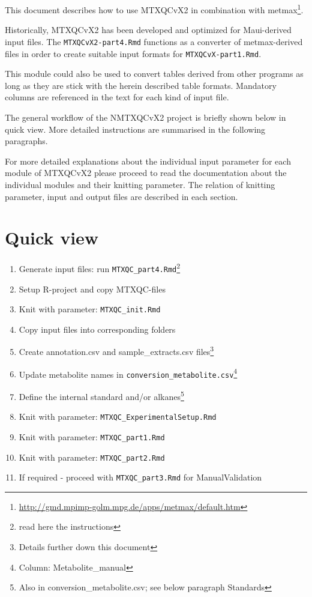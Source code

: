 \documentclass[]{book}
\providecommand{\tightlist}{%
  \setlength{\itemsep}{0pt}\setlength{\parskip}{0pt}}
\let\rmarkdownfootnote\footnote%
\def\footnote{\protect\rmarkdownfootnote}
\theoremstyle{definition}
\theoremstyle{definition}
\theoremstyle{definition}
\theoremstyle{remark}
\begin{document}
This document describes how to use MTXQCvX2 in combination with
metmax\footnote{\url{http://gmd.mpimp-golm.mpg.de/apps/metmax/default.htm}}.

Historically, MTXQCvX2 has been developed and optimized for Maui-derived
input files. The \texttt{MTXQCvX2-part4.Rmd} functions as a converter of
metmax-derived files in order to create suitable input formats for
\texttt{MTXQCvX-part1.Rmd}.

This module could also be used to convert tables derived from other
programs as long as they are stick with the herein described table
formats. Mandatory columns are referenced in the text for each kind of
input file.

The general workflow of the NMTXQCvX2 project is briefly shown below in
quick view. More detailed instructions are summarised in the following
paragraphs.

For more detailed explanations about the individual input parameter for
each module of MTXQCvX2 please proceed to read the documentation about
the individual modules and their knitting parameter. The relation of
knitting parameter, input and output files are described in each
section.

\section{Quick view}\label{quick-view-1}

\begin{enumerate}
\def\labelenumi{\arabic{enumi}.}
\tightlist
\item
  Generate input files: run \texttt{MTXQC\_part4.Rmd}\footnote{read here
    the instructions}
\item
  Setup R-project and copy MTXQC-files
\item
  Knit with parameter: \texttt{MTXQC\_init.Rmd}
\item
  Copy input files into corresponding folders
\item
  Create annotation.csv and sample\_extracts.csv files\footnote{Details
    further down this document}
\item
  Update metabolite names in
  \texttt{conversion\_metabolite.csv}\footnote{Column:
    Metabolite\_manual}
\item
  Define the internal standard and/or alkanes\footnote{Also in
    conversion\_metabolite.csv; see below paragraph Standards}
\item
  Knit with parameter: \texttt{MTXQC\_ExperimentalSetup.Rmd}
\item
  Knit with parameter: \texttt{MTXQC\_part1.Rmd}
\item
  Knit with parameter: \texttt{MTXQC\_part2.Rmd}
\item
  If required - proceed with \texttt{MTXQC\_part3.Rmd} for
  ManualValidation
\end{enumerate}
\end{document}
